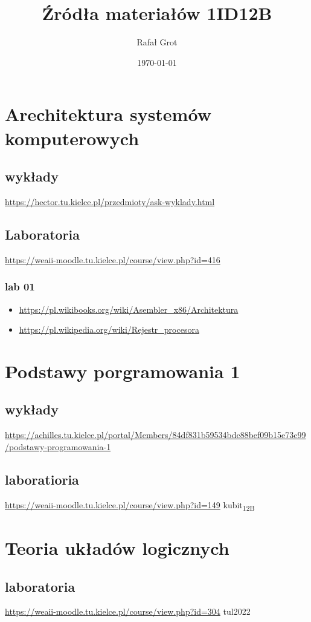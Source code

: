 \documentclass[11pt]{article}
\author{Rafał Grot}
\date{\today}
\title{Źródła materiałów 1ID12B}
\begin{document}
\maketitle
\tableofcontents


\section{Arechitektura systemów komputerowych}
\label{sec:org684cbd5}
\subsection{wykłady}
\label{sec:orgfa2bd48}
\url{https://hector.tu.kielce.pl/przedmioty/ask-wyklady.html}
\subsection{Laboratoria}
\label{sec:org5df8189}
\url{https://weaii-moodle.tu.kielce.pl/course/view.php?id=416}
\subsubsection{lab 01}
\label{sec:orgc8ff39b}
\begin{itemize}
\item \url{https://pl.wikibooks.org/wiki/Asembler\_x86/Architektura}
\item \url{https://pl.wikipedia.org/wiki/Rejestr\_procesora}
\end{itemize}
\section{Podstawy porgramowania 1}
\label{sec:orgd0e292c}
\subsection{wykłady}
\label{sec:org5293359}
\url{https://achilles.tu.kielce.pl/portal/Members/84df831b59534bdc88bef09b15e73c99/podstawy-programowania-1}
\subsection{laboratioria}
\label{sec:org3f2cefe}
\url{https://weaii-moodle.tu.kielce.pl/course/view.php?id=149} kubit\textsubscript{12B}
\section{Teoria układów logicznych}
\label{sec:orgb72ec20}
\subsection{laboratoria}
\label{sec:org6d27f12}
\url{https://weaii-moodle.tu.kielce.pl/course/view.php?id=304} tul2022
\end{document}

